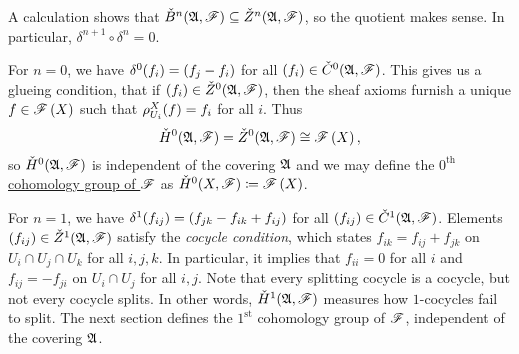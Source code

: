 \documentclass[../Moduli_Spaces_of_Riemann_Surfaces.tex]{subfiles}
\begin{document}
    \vspace{-0.05in}
    \begin{remark}
        A calculation shows that $\check{B}^n\!\left(\mathfrak{A},\mathscr{F}\right)\subseteq\check{Z}^n\!\left(\mathfrak{A},\mathscr{F}\right)$, so the quotient makes sense. In particular, $\delta^{n+1}\circ\delta^n=0$.\exqed
    \end{remark}
    \begin{remark}
        For $n=0$, we have $\delta^0\!\left(f_i\right)=\left(f_j-f_i\right)$ for all $\left(f_i\right)\in\check{C}^0\!\left(\mathfrak{A},\mathscr{F}\right)$. This gives us a glueing condition, that if $\left(f_i\right)\in\check{Z}^0\!\left(\mathfrak{A},\mathscr{F}\right)$, then the sheaf axioms furnish a unique $f\in\mathscr{F}\left(X\right)$ such that $\rho^X_{U_i}\!\left(f\right)=f_i$ for all $i$. Thus
        \begin{equation*}
            \check{H}^0\!\left(\mathfrak{A},\mathscr{F}\right)=\check{Z}^0\!\left(\mathfrak{A},\mathscr{F}\right)\cong\mathscr{F}\left(X\right),
        \end{equation*}
        so $\check{H}^0\!\left(\mathfrak{A},\mathscr{F}\right)$ is independent of the covering $\mathfrak{A}$ and we may define the \ul{$0^\textrm{th}$ cohomology group of $\mathscr{F}$} as $\check{H}^0\!\left(X,\mathscr{F}\right)\coloneqq\mathscr{F}\left(X\right)$.\exqed
    \end{remark}
    \begin{remark}
        For $n=1$, we have $\delta^1\!\left(f_{ij}\right)=\left(f_{jk}-f_{ik}+f_{ij}\right)$ for all $\left(f_{ij}\right)\in\check{C}^1\!\left(\mathfrak{A},\mathscr{F}\right)$. Elements $\left(f_{ij}\right)\in\check{Z}^1\!\left(\mathfrak{A},\mathscr{F}\right)$ satisfy the \textit{cocycle condition}, which states $f_{ik}=f_{ij}+f_{jk}$ on $U_i\cap U_j\cap U_k$ for all $i,j,k$. In particular, it implies that $f_{ii}=0$ for all $i$ and $f_{ij}=-f_{ji}$ on $U_i\cap U_j$ for all $i,j$. Note that every splitting cocycle is a cocycle, but not every cocycle splits. In other words, $\check{H}^1\!\left(\mathfrak{A},\mathscr{F}\right)$ measures how $1$-cocycles fail to split. The next section defines the $1^\textrm{st}$ cohomology group of $\mathscr{F}$, independent of the covering $\mathfrak{A}$.\exqed
    \end{remark}
\end{document}
